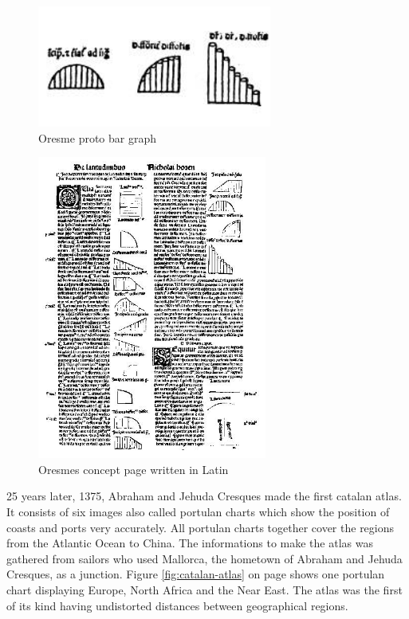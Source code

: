 \begin{figure}[!htb]
\centering
\includegraphics[height=4cm,keepaspectratio]{images/history/oresme-proto.jpg}
\caption[
    Oresme proto bar graph, Urldate: 07.2016 \newline
\small\texttt{\url{http://datavis.ca/milestones//admin/uploads/images/icons/oresmekl.gif}}
]{Oresme proto bar graph}
\label{fig:oresme-proto}
\end{figure}

\begin{figure}[!htb]
\centering
\includegraphics[height=10cm,keepaspectratio]{images/history/oresme-page.jpg}
\caption[
    Oresmes concept page written in Latin, Urldate: 07.2016 \newline
\small\texttt{\url{http://datavis.ca/milestones//admin/uploads/images/oresme6.gif}}
]{Oresmes concept page written in Latin}
\label{fig:oresme-page}
\end{figure}

25 years later, 1375, Abraham and Jehuda Cresques made the first catalan atlas. It consists of six images also called portulan charts which show the position of coasts and ports very accurately. All portulan charts together cover the regions from the Atlantic Ocean to China. The informations to make the atlas was gathered from sailors who used Mallorca, the hometown of Abraham and Jehuda Cresques, as a junction. Figure \ref{fig:catalan-atlas} on page \pageref{fig:catalan-atlas} shows one portulan chart displaying Europe, North Africa and the Near East. The atlas was the first of its kind having undistorted distances between geographical regions.

